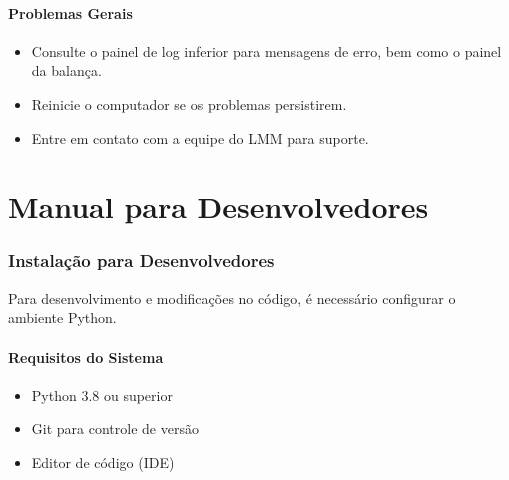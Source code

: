 \documentclass[12pt,a4paper]{article}
\begin{document}
\subsection{Problemas Gerais}
\begin{itemize}
\item Consulte o painel de log inferior para mensagens de erro, bem como o painel da balança.
\item Reinicie o computador se os problemas persistirem.
\item Entre em contato com a equipe do LMM para suporte.
\end{itemize}

\part{Manual para Desenvolvedores}

\section{Instalação para Desenvolvedores}
Para desenvolvimento e modificações no código, é necessário configurar o ambiente Python.

\subsection{Requisitos do Sistema}
\begin{itemize}
\item Python 3.8 ou superior
\item Git para controle de versão
\item Editor de código (IDE)
\end{itemize}
\end{document}
